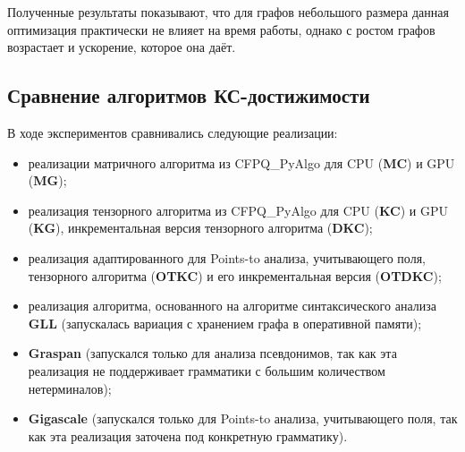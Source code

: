 Полученные результаты показывают, что для графов небольшого размера данная оптимизация практически не влияет на время работы, однако с ростом графов возрастает и ускорение, которое она даёт.

\subsection{Сравнение алгоритмов КС-достижимости}

В ходе экспериментов сравнивались следующие реализации:
\begin{itemize}
    \item реализации матричного алгоритма из CFPQ\_PyAlgo для CPU (\textbf{MC}) и GPU (\textbf{MG});
    \item реализация тензорного алгоритма из CFPQ\_PyAlgo для CPU (\textbf{KC}) и GPU (\textbf{KG}), инкрементальная версия тензорного алгоритма (\textbf{DKC});
    \item реализация адаптированного для Points-to анализа, учитывающего поля, тензорного алгоритма (\textbf{OTKC}) и его инкрементальная версия (\textbf{OTDKC});
    \item реализация алгоритма, основанного на алгоритме синтаксического анализа \textbf{GLL} (запускалась вариация с хранением графа в оперативной памяти);
    \item \textbf{Graspan} (запускался только для анализа псевдонимов, так как эта реализация не поддерживает грамматики с большим количеством нетерминалов);
    \item \textbf{Gigascale} (запускался только для Points-to анализа, учитывающего поля, так как эта реализация заточена под конкретную грамматику).
\end{itemize}

